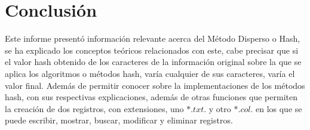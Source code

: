 \documentclass[10pt,conference]{IEEEtran}
\begin{document}
\section{\textbf{Conclusión}}
Este informe presentó información relevante acerca del Método Disperso o Hash, se ha explicado los conceptos teóricos relacionados con este, cabe precisar que si el valor hash obtenido de los caracteres de la información original sobre la que se aplica los algoritmos o métodos hash, varía cualquier de sus caracteres, varía el valor final. Además de permitir conocer sobre la implementaciones de los métodos hash, con sus respectivas explicaciones, además de otras funciones que permiten la creación de dos registros, con extensiones, uno $*.txt$. y otro $*.col$. en los que se puede escribir, mostrar, buscar, modificar y eliminar registros. 

\medskip

\end{document}
